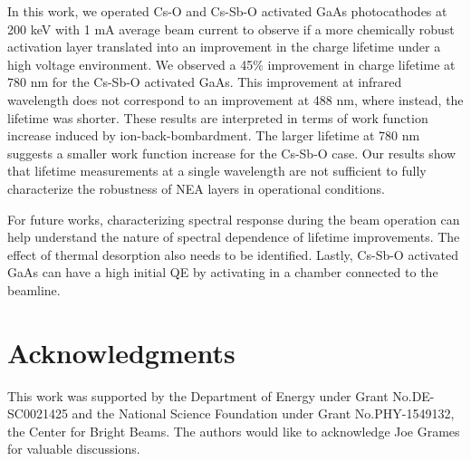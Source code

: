In this work, we operated Cs-O and Cs-Sb-O activated GaAs photocathodes at 200 keV with 1 mA average beam current to observe if a more chemically robust activation layer translated into an improvement in the charge lifetime under a high voltage environment.
We observed a 45\% improvement in charge lifetime at 780 nm for the Cs-Sb-O activated GaAs. This improvement at infrared wavelength does not correspond to an improvement at 488 nm, where instead, the lifetime was shorter. These results are interpreted in terms of work function increase induced by ion-back-bombardment. The larger lifetime at 780 nm suggests a smaller work function increase for the Cs-Sb-O case. Our results show that lifetime measurements at a single wavelength are not sufficient to fully characterize the robustness of NEA layers in operational conditions. 

For future works, characterizing spectral response during the beam operation can help understand the nature of spectral dependence of lifetime improvements. The effect of thermal desorption also needs to be identified.
Lastly, Cs-Sb-O activated GaAs can have a high initial QE by activating in a chamber connected to the beamline.


\section{Acknowledgments}

This work was supported by the Department of Energy under Grant No.DE-SC0021425 and the National Science Foundation under Grant No.PHY-1549132, the Center for Bright Beams.
The authors would like to acknowledge Joe Grames for valuable discussions.